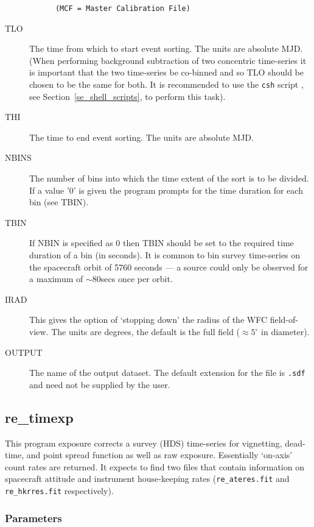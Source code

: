 \begin{description}
\begin{verbatim}
      (MCF = Master Calibration File)
\end{verbatim}

\item[TLO  ]
The time from which to start event sorting.   The units are absolute
MJD.  (When performing background subtraction of two concentric
time-series it is important that the two time-series be co-binned and
so TLO should be chosen to be the same for both. It is recommended to
use the {\tt csh} script , see
Section~\ref{se_shell_scripts}, to perform this task).
\item[THI ]
The time to end event sorting.   The units are absolute MJD.
\item[NBINS]
The number of bins into which the time extent of the sort 
is to be divided. If a value '0' is given the program prompts for the
time duration for each bin (see TBIN).
\item[TBIN]
If NBIN is specified as 0 then TBIN should be set to the required
time duration of a bin (in seconds).  It is common to bin survey time-series on
the \ro spacecraft orbit of 5760 seconds --- a source could only be
observed for a maximum of $\sim 80$secs once per orbit.
\item[IRAD]
This gives the option of `stopping down' the radius of the WFC
field-of-view.  The units are degrees, the default is the full field
($\approx 5^{\circ}$ in diameter).
\item[OUTPUT]
The name of the output dataset. The default extension for the file is 
{\tt .sdf } and need not be supplied by the user.
\end{description}

\subsection{\label{ss_re_timexp}re\_timexp}  

This program exposure corrects a survey (HDS) time-series for
vignetting, dead-time, and point spread function as well as raw
exposure.  Essentially `on-axis' count rates are returned.   It expects
to find two files that contain information on spacecraft attitude and
instrument house-keeping rates ({\tt re\_ateres.fit} and {\tt
re\_hkrres.fit} respectively).

\subsubsection{Parameters}

